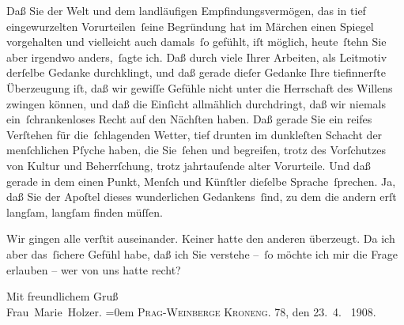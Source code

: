 \pstart
           Daß Sie der Welt und dem landläufigen Empfindungsvermögen, das in tief eingewurzelten
               Vorurteilen ſeine Begründung hat im Märchen
               einen Spiegel vorgehalten und vielleicht auch damals ſo gefühlt, iſt möglich,
               heute ſtehn Sie aber ir{\pb}gendwo
               anders, ſagte ich. Daß durch viele Ihrer Arbeiten, als Leitmotiv derſelbe Gedanke
               durchklingt, und daß gerade dieſer Gedanke Ihre tiefinnerſte Überzeugung iſt, daß wir
               gewiſſe Gefühle nicht unter die Herrschaft des Willens zwingen können, und daß die
               Einſicht allmählich durchdringt, daß wir niemals ein ſchrankenloses Recht auf den
               Nächſten haben. Daß gerade Sie ein reifes Verſtehen für die ſchlagenden Wetter, tief
               drunten im dunkleſten Schacht der menſchlichen Pſyche haben, die Sie ſehen und
               begreifen, trotz des Vorſchutzes von Kultur und Beherrſchung, trotz jahrtauſende
               alter Vorurteile. {\pb}Und daß gerade in dem
               einen Punkt, Menſch und Künſtler dieſelbe Sprache ſprechen. Ja, daß Sie der Apoſtel
               dieses wunderlichen Gedankens ſind, zu dem die andern erſt langſam, langſam finden
               müſſen.\pend
           
\pstart
           Wir gingen alle verſti{\geminationm}t auseinander. Keiner hatte den
               anderen überzeugt. Da ich aber das ſichere Gefühl habe, daß ich Sie verstehe – ſo
               möchte ich mir die Frage erlauben – wer von uns hatte recht?\pend
           
\pstart
           Mit freundlichem Gruß{\\[\baselineskip]}\spacefill\mbox{Frau Marie Holzer.}\pend
           \leftskip=0em{}
\pstart
           \textsc{Prag-Weinberge Kroneng. 78}, den 23. 4.  1908.\pend
           \endnumbering{}  \newcommand{\dateiname}{L04220}\newcommand{\titel}{Marie Holzer an Arthur Schnitzler, 23. 4. 1908}\newcommand{\editorInnen}{Herausgegeben von Jahnke, SelmaMüller, Martin Anton}
